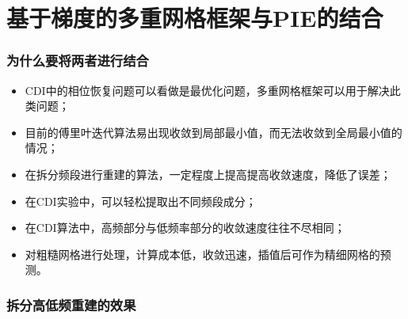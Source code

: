 \documentclass[10pt,aspectratio=169]{beamer} %
\begin{document}
\section{基于梯度的多重网格框架与PIE的结合}

\begin{frame}
    \frametitle{为什么要将两者进行结合}
    \begin{itemize}
        \item CDI中的相位恢复问题可以看做是最优化问题，多重网格框架可以用于解决此类问题；
        \item 目前的傅里叶迭代算法易出现收敛到局部最小值，而无法收敛到全局最小值的情况；
        \item 在拆分频段进行重建的算法，一定程度上提高提高收敛速度，降低了误差；
        \item 在CDI实验中，可以轻松提取出不同频段成分；
        \item 在CDI算法中，高频部分与低频率部分的收敛速度往往不尽相同；
        \item 对粗糙网格进行处理，计算成本低，收敛迅速，插值后可作为精细网格的预测。
    \end{itemize}
\end{frame}

\begin{frame}
    \frametitle{拆分高低频重建的效果}
    \begin{figure}
        \qquad
        \qquad
    \end{figure}
\end{frame}
\end{document}
